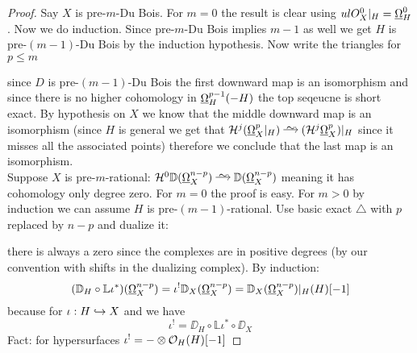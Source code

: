 \documentclass[12pt]{article}
\renewcommand{\cH}{\mathcal{H}}
\newcommand{\LL}{\mathbb{L}}
\begin{document}
\begin{proof}
Say $X$ is pre-$m$-Du Bois. For $m = 0$ the result is clear using $ulO_X^0|_H = \underline{\Omega}_H^0$. Now we do induction. Since pre-$m$-Du Bois implies $m-1$ as well we get $H$ is pre-$(m-1)$-Du Bois by the induction hypothesis. Now write the triangles for $p \le m$
\begin{center}
\end{center}
since $D$ is pre-$(m-1)$-Du Bois the first downward map is an isomorphism and since there is no higher cohomology in $\underline{\Omega}_H^{p-1}(-H)$ the top seqeucne is short exact. By hypothesis on $X$ we know that the middle downward map is an isomorphism (since $H$ is general we get that $\cH^j(\ulO_X^p|_H) \iso (\cH^j \ulO_X^p)|_H$ since it misses all the associated points) therefore we conclude that the last map is an isomorphism. 
\bigskip\\
Suppose $X$ is pre-$m$-rational: $\cH^0 \DD(\ulO_X^{n-p}) \iso \DD(\ulO_X^{n-p})$ meaning it has cohomology only degree zero. For $m = 0$ the proof is easy. For $m > 0$ by induction we can assume $H$ is pre-$(m-1)$-rational. Use basic exact $\triangle$ with $p$ replaced by $n-p$ and dualize it:
\begin{center}
\end{center}
there is always a zero since the complexes are in positive degrees (by our convention with shifts in the dualizing complex). By induction:
\[ (\DD_H \circ \LL \iota^*) (\ulO_X^{n-p}) = \iota^! \DD_X(\ulO_X^{n-p}) = \DD_X(\ulO_X^{n-p})|_H (H)[-1] \]
because for $\iota : H \hookrightarrow X$ and we have
\[ \iota^! = \DD_H \circ \LL \iota^* \circ \DD_X \]
Fact: for hypersurfaces $\iota^! = - \otimes \mathcal{O}_{H}(H)[-1]$
\end{proof}
\end{document}
